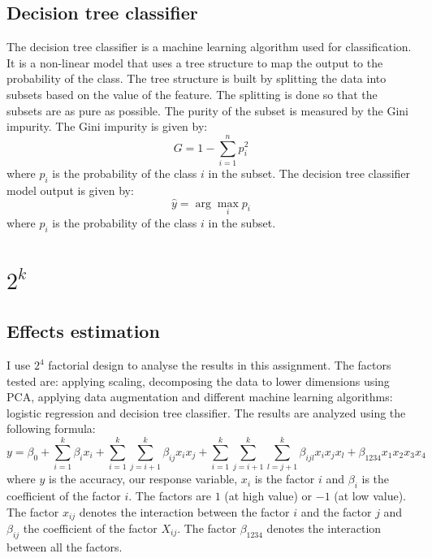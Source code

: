 \documentclass{article}
\begin{document}
\subsection{Decision tree classifier}
\label{subsec:decision_tree}
The decision tree classifier is a machine learning algorithm used for classification. It is a non-linear model that uses a tree structure to map the output to the probability of the class. The tree structure is built by splitting the data into subsets based on the value of the feature. The splitting is done so that the subsets are as pure as possible. The purity of the subset is measured by the Gini impurity. The Gini impurity is given by:
\begin{equation}
    G = 1 - \sum_{i=1}^{n} p_i^2
\end{equation}
where $p_i$ is the probability of the class $i$ in the subset. The decision tree classifier model output is given by:
\begin{equation}
    \hat{y} = \arg\max_{i} p_i
\end{equation}
where $p_i$ is the probability of the class $i$ in the subset.

\section{\texorpdfstring{$2^k$} }
\label{sec:factorial_design}

\subsection{Effects estimation}
I use $2^4$ factorial design to analyse the results in this assignment. The factors tested are: applying scaling, decomposing the data to lower dimensions using PCA, applying data augmentation and different machine learning algorithms: logistic regression and decision tree classifier. The results are analyzed using the following formula:
\begin{equation}
    y = \beta_0 + \sum_{i=1}^{k} \beta_i x_i + \sum_{i=1}^{k} \sum_{j=i+1}^{k} \beta_{ij} x_i x_j + \sum_{i=1}^{k} \sum_{j=i+1}^{k} \sum_{l=j+1}^{k} \beta_{ijl} x_i x_j x_l + \beta_{1234} x_1 x_2 x_3 x_4
\end{equation}
where $y$ is the accuracy, our response variable, $x_i$ is the factor $i$ and $\beta_i$ is the coefficient of the factor $i$. The factors are $1$ (at high value) or $-1$ (at low value). The factor $x_{ij}$ denotes the interaction between the factor $i$ and the factor $j$ and $\beta_{ij}$ the coefficient of the factor $X_{ij}$. The factor $\beta_{1234}$ denotes the interaction between all the factors.
\end{document}
